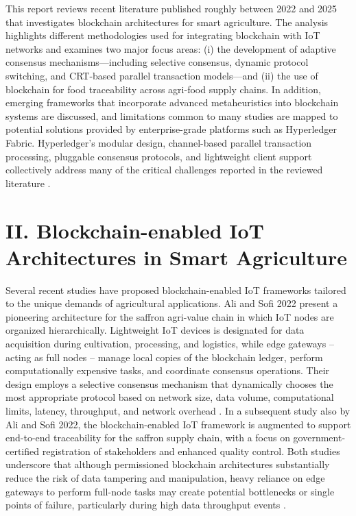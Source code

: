 \documentclass[12pt,onecolumn]{IEEEtran} %
\begin{document}
This report reviews recent literature published roughly between 2022 and 2025 that investigates blockchain architectures for smart agriculture. The analysis highlights different methodologies used for integrating blockchain with IoT networks and examines two major focus areas: (i) the development of adaptive consensus mechanisms---including selective consensus, dynamic protocol switching, and CRT-based parallel transaction models---and (ii) the use of blockchain for food traceability across agri-food supply chains. In addition, emerging frameworks that incorporate advanced metaheuristics into blockchain systems are discussed, and limitations common to many studies are mapped to potential solutions provided by enterprise-grade platforms such as Hyperledger Fabric. Hyperledger's modular design, channel-based parallel transaction processing, pluggable consensus protocols, and lightweight client support collectively address many of the critical challenges reported in the reviewed literature \cite{ali2022blockchainenabledarchitecture}.

\section*{II. Blockchain-enabled IoT Architectures in Smart Agriculture}

Several recent studies have proposed blockchain-enabled IoT frameworks tailored to the unique demands of agricultural applications. Ali and Sofi 2022 present a pioneering architecture for the saffron agri-value chain in which IoT nodes are organized hierarchically. Lightweight IoT devices is designated for data acquisition during cultivation, processing, and logistics, while edge gateways -- acting as full nodes -- manage local copies of the blockchain ledger, perform computationally expensive tasks, and coordinate consensus operations. Their design employs a selective consensus mechanism that dynamically chooses the most appropriate protocol based on network size, data volume, computational limits, latency, throughput, and network overhead \cite{ali2022blockchainenabledarchitecture}. In a subsequent study also by Ali and Sofi 2022, the blockchain-enabled IoT framework is augmented to support end-to-end traceability for the saffron supply chain, with a focus on government-certified registration of stakeholders and enhanced quality control. Both studies underscore that although permissioned blockchain architectures substantially reduce the risk of data tampering and manipulation, heavy reliance on edge gateways to perform full-node tasks may create potential bottlenecks or single points of failure, particularly during high data throughput events \cite{ali2022blockchainenabledarchitecture}.
\end{document}
